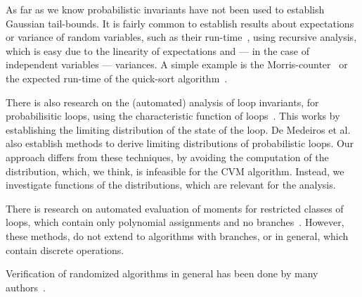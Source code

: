 As far as we know probabilistic invariants have not been used to establish Gaussian tail-bounds.
It is fairly common to establish results about expectations or variance of random variables, such as their run-time~\cite[Section 1.4]{motwani1995}, using recursive analysis, which is easy due to the linearity of expectations and --- in the case of independent variables --- variances.
A simple example is the Morris-counter~\cite{morris1978} or the expected run-time of the quick-sort algorithm~\cite[Section 2.5]{mitzenmacher2005}.

There is also research on the (automated) analysis of loop invariants, for probabilisitic loops, using the characteristic function of loops~\cite{batz2023, mciver2005}.
This works by establishing the limiting distribution of the state of the loop.
De Medeiros et al.~\cite[Section 3.2]{demedeiros2024} also establish methods to derive limiting distributions of probabilistic loops.
Our approach differs from these techniques, by avoiding the computation of the distribution, which, we think, is infeasible for the CVM algorithm.
Instead, we investigate functions of the distributions, which are relevant for the analysis.

There is research on automated evaluation of moments for restricted classes of loops, which contain only polynomial assignments and no branches~\cite{bartocci2019,kofnov2022}. 
However, these methods, do not extend to algorithms with branches, or in general, which contain discrete operations.

Verification of randomized algorithms in general has been done by many authors~\cite{bosshard2024, eberl2020, karayel2022, karayel2023, Probabilistic_Prime_Tests-AFP, tan2024}.


